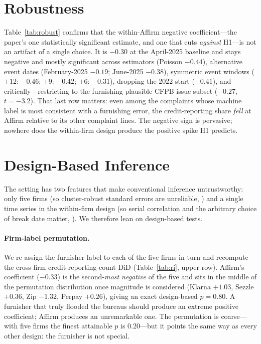 \documentclass[12pt]{article}
\begin{document}
\section{Robustness}\label{sec:robust}
Table~\ref{tab:robust} confirms that the within-Affirm negative coefficient---the paper's one
statistically significant estimate, and one that cuts \emph{against} H1---is not an artifact of a
single choice. It is $-0.30$ at the April-2025 baseline and stays negative and mostly
significant across estimators (Poisson $-0.44$), alternative event dates (February-2025 $-0.19$;
June-2025 $-0.38$), symmetric event windows ($\pm 12$: $-0.46$; $\pm 9$: $-0.42$; $\pm 6$:
$-0.31$), dropping the 2022 start ($-0.41$), and---critically---restricting to the
furnishing-plausible CFPB issue subset ($-0.27$, $t=-3.2$). That last row matters: even among
the complaints whose machine label is most consistent with a furnishing error, the
credit-reporting share \emph{fell} at Affirm relative to its other complaint lines. The negative
sign is pervasive; nowhere does the within-firm design produce the positive spike H1 predicts.

\section{Design-Based Inference}\label{sec:inf}
The setting has two features that make conventional inference untrustworthy: only five firms
(so cluster-robust standard errors are unreliable, \citealp{cameron2008,mackinnon2017}) and a
single time series in the within-firm design (so serial correlation and the arbitrary choice of
break date matter, \citealp{bertrand2004,conley2011}). We therefore lean on design-based tests.

\paragraph{Firm-label permutation.} We re-assign the furnisher label to each of the five firms
in turn and recompute the cross-firm credit-reporting-count DiD (Table~\ref{tab:ri}, upper row).
Affirm's coefficient ($-0.33$) is the second-\emph{most negative} of the five and sits in the
middle of the permutation distribution once magnitude is considered (Klarna $+1.03$, Sezzle
$+0.36$, Zip $-1.32$, Perpay $+0.26$), giving an exact design-based $p=0.80$. A furnisher that
truly flooded the bureaus should produce an extreme positive coefficient; Affirm produces an
unremarkable one. The permutation is coarse---with five firms the finest attainable $p$ is
$0.20$---but it points the same way as every other design: the furnisher is not special.
\end{document}
